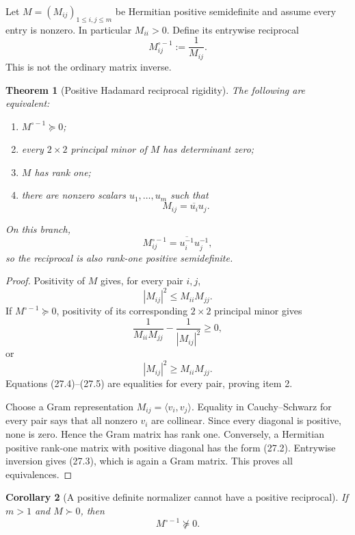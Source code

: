 \documentclass[11pt]{article}
\newtheorem{theorem}{Theorem}[section]
\newtheorem{corollary}[theorem]{Corollary}
\theoremstyle{remark}
\begin{document}
Let \(M=(M_{ij})_{1\le i,j\le m}\) be Hermitian positive
semidefinite and assume every entry is nonzero.  In particular
\(M_{ii}>0\).  Define its entrywise reciprocal
\[
                         M^{\circ-1}_{ij}:=\frac1{M_{ij}}.   \tag{27.1}
\]
This is not the ordinary matrix inverse.

\begin{theorem}[Positive Hadamard reciprocal rigidity]
\label{thm:v12v27-rigidity}
The following are equivalent:
\begin{enumerate}
\item \(M^{\circ-1}\succeq0\);
\item every \(2\times2\) principal minor of \(M\) has determinant
      zero;
\item \(M\) has rank one;
\item there are nonzero scalars \(u_1,\ldots,u_m\) such that
\[
                         M_{ij}=\overline{u_i}u_j.           \tag{27.2}
\]
\end{enumerate}
On this branch,
\[
                         M^{\circ-1}_{ij}
 =\overline{u_i^{-1}}u_j^{-1},                             \tag{27.3}
\]
so the reciprocal is also rank-one positive semidefinite.
\end{theorem}

\begin{proof}
Positivity of \(M\) gives, for every pair \(i,j\),
\[
                         |M_{ij}|^2\le M_{ii}M_{jj}.         \tag{27.4}
\]
If \(M^{\circ-1}\succeq0\), positivity of its corresponding
\(2\times2\) principal minor gives
\[
 \frac1{M_{ii}M_{jj}}-\frac1{|M_{ij}|^2}\ge0,
\]
or
\[
                         |M_{ij}|^2\ge M_{ii}M_{jj}.         \tag{27.5}
\]
Equations (27.4)--(27.5) are equalities for every pair, proving item
2.

Choose a Gram representation
\(M_{ij}=\langle v_i,v_j\rangle\).  Equality in Cauchy--Schwarz for
every pair says that all nonzero \(v_i\) are collinear.  Since every
diagonal is positive, none is zero.  Hence the Gram matrix has rank
one.  Conversely, a Hermitian positive rank-one matrix with positive
diagonal has the form (27.2).  Entrywise inversion gives (27.3),
which is again a Gram matrix.  This proves all equivalences.
\end{proof}

\begin{corollary}[A positive definite normalizer cannot have a
positive reciprocal]
\label{cor:v12v27-pd}
If \(m>1\) and \(M\succ0\), then
\[
                         M^{\circ-1}\not\succeq0.            \tag{27.6}
\]
\end{corollary}
\end{document}

